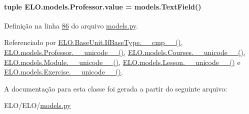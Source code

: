 \hypertarget{classELO_1_1models_1_1Professor_abfa283169333876d02cf63886ca872e6}{}
\paragraph[{value}]{\setlength{\rightskip}{0pt plus 5cm}tuple E\+L\+O.\+models.\+Professor.\+value = models.\+Text\+Field()\hspace{0.3cm}{\ttfamily [static]}}\label{classELO_1_1models_1_1Professor_abfa283169333876d02cf63886ca872e6}


Definição na linha \hyperlink{ELO_2models_8py_source_l00086}{86} do arquivo \hyperlink{ELO_2models_8py_source}{models.\+py}.



Referenciado por \hyperlink{classELO_1_1BaseUnit_1_1IfBaseType_a22d6f30c4d9504a9c20d0ff5a538544d}{E\+L\+O.\+Base\+Unit.\+If\+Base\+Type.\+\_\+\+\_\+cmp\+\_\+\+\_\+()}, \hyperlink{classELO_1_1models_1_1Professor_a8c0714e4a283c139c0d7aed94a498a7b}{E\+L\+O.\+models.\+Professor.\+\_\+\+\_\+unicode\+\_\+\+\_\+()}, \hyperlink{classELO_1_1models_1_1Courses_a8676cba71b99ab2ba60726b9b5e33825}{E\+L\+O.\+models.\+Courses.\+\_\+\+\_\+unicode\+\_\+\+\_\+()}, \hyperlink{classELO_1_1models_1_1Module_a8fc9fadf09fa7b3bbcfea69ebe25d278}{E\+L\+O.\+models.\+Module.\+\_\+\+\_\+unicode\+\_\+\+\_\+()}, \hyperlink{classELO_1_1models_1_1Lesson_a53e265de97c6b73f262f62a80f9ca994}{E\+L\+O.\+models.\+Lesson.\+\_\+\+\_\+unicode\+\_\+\+\_\+()} e \hyperlink{classELO_1_1models_1_1Exercise_a23f81c66e4d6bc5a4582d74d191f5117}{E\+L\+O.\+models.\+Exercise.\+\_\+\+\_\+unicode\+\_\+\+\_\+()}.



A documentação para esta classe foi gerada a partir do seguinte arquivo\+:\begin{DoxyCompactItemize}
\item 
E\+L\+O/\+E\+L\+O/\hyperlink{ELO_2models_8py}{models.\+py}\end{DoxyCompactItemize}
